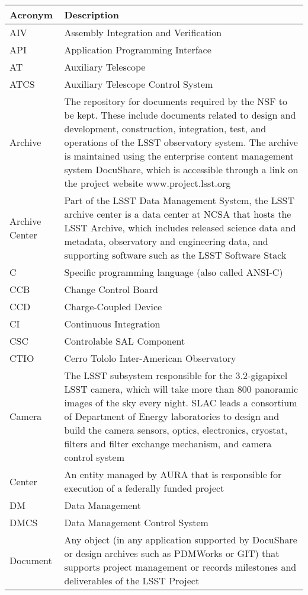 \addtocounter{table}{-1}
\begin{longtable}{|p{}|p{}|}\hline
\textbf{Acronym} & \textbf{Description}  \\\hline

AIV & Assembly Integration and Verification \\\hline
API & Application Programming Interface \\\hline
AT & Auxiliary Telescope \\\hline
ATCS & Auxiliary Telescope Control System \\\hline
Archive & The repository for documents required by the NSF to be kept. These include documents related to design and development, construction, integration, test, and operations of the LSST observatory system. The archive is maintained using the enterprise content management system DocuShare, which is accessible through a link on the project website www.project.lsst.org \\\hline
Archive Center & Part of the LSST Data Management System, the LSST archive center is a data center at NCSA that hosts the LSST Archive, which includes released science data and metadata, observatory and engineering data, and supporting software such as the LSST Software Stack \\\hline
C & Specific programming language (also called ANSI-C) \\\hline
CCB & Change Control Board \\\hline
CCD & Charge-Coupled Device \\\hline
CI & Continuous Integration \\\hline
CSC & Controlable SAL Component \\\hline
CTIO & Cerro Tololo Inter-American Observatory \\\hline
Camera & The LSST subsystem responsible for the 3.2-gigapixel LSST camera, which will take more than 800 panoramic images of the sky every night. SLAC leads a consortium of Department of Energy laboratories to design and build the camera sensors, optics, electronics, cryostat, filters and filter exchange mechanism, and camera control system \\\hline
Center & An entity managed by AURA that is responsible for execution of a federally funded project \\\hline
DM & Data Management \\\hline
DMCS & Data Management Control System \\\hline
Document & Any object (in any application supported by DocuShare or design archives such as PDMWorks or GIT) that supports project management or records milestones and deliverables of the LSST Project \\\hline

\end{longtable}
